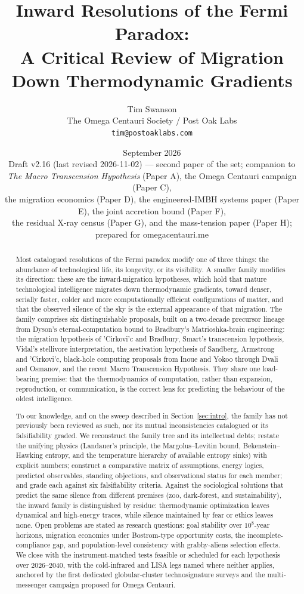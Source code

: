 \documentclass[11pt]{article}
\title{\textbf{Inward Resolutions of the Fermi Paradox:\\ A Critical Review of Migration Down Thermodynamic Gradients}}
\author{Tim Swanson\\[2pt]
\small The Omega Centauri Society / Post Oak Labs\\
\small \texttt{tim@postoaklabs.com}}
\date{September 2026 \\[4pt] \small Draft v2.16 (last revised 2026-11-02) --- second paper of the set; companion to \emph{The Macro Transcension Hypothesis} (Paper A), the Omega Centauri campaign (Paper C),\\ \small the migration economics (Paper D), the engineered-IMBH systems paper (Paper E), the joint accretion bound (Paper F),\\ \small the residual X-ray census (Paper G), and the mass-tension paper (Paper H);\\ \small prepared for omegacentauri.me}
\begin{document}
\maketitle

\begin{abstract}
\noindent
Most catalogued resolutions of the Fermi paradox modify one of three things: the abundance of technological life, its longevity, or its visibility. A smaller family modifies its direction: these are the inward-migration hypotheses, which hold that mature technological intelligence migrates down thermodynamic gradients, toward denser, serially faster, colder and more computationally efficient configurations of matter, and that the observed silence of the sky is the external appearance of that migration. The family comprises six distinguishable proposals, built on a two-decade precursor lineage from Dyson's eternal-computation bound to Bradbury's Matrioshka-brain engineering: the migration hypothesis of 'Cirkovi'c and Bradbury, Smart's transcension hypothesis, Vidal's stellivore interpretation, the aestivation hypothesis of Sandberg, Armstrong and 'Cirkovi'c, black-hole computing proposals from Inoue and Yokoo through Dvali and Osmanov, and the recent Macro Transcension Hypothesis. They share one load-bearing premise: that the thermodynamics of computation, rather than expansion, reproduction, or communication, is the correct lens for predicting the behaviour of the oldest intelligence.

To our knowledge, and on the sweep described in Section~\ref{sec:intro}, the family has not previously been reviewed as such, nor its mutual inconsistencies catalogued or its falsifiability graded. We reconstruct the family tree and its intellectual debts; restate the unifying physics (Landauer's principle, the Margolus--Levitin bound, Bekenstein--Hawking entropy, and the temperature hierarchy of available entropy sinks) with explicit numbers; construct a comparative matrix of assumptions, energy logics, predicted observables, standing objections, and observational status for each member; and grade each against six falsifiability criteria. Against the sociological solutions that predict the same silence from different premises (zoo, dark-forest, and sustainability), the inward family is distinguished by residue: thermodynamic optimization leaves dynamical and high-energy traces, while silence maintained by fear or ethics leaves none. Open problems are stated as research questions: goal stability over $10^{8}$-year horizons, migration economics under Bostrom-type opportunity costs, the incomplete-compliance gap, and population-level consistency with grabby-aliens selection effects. We close with the instrument-matched tests feasible or scheduled for each hypothesis over 2026--2040, with the cold-infrared and LISA legs named where neither applies, anchored by the first dedicated globular-cluster technosignature surveys and the multi-messenger campaign proposed for Omega Centauri.
\end{abstract}
\end{document}
